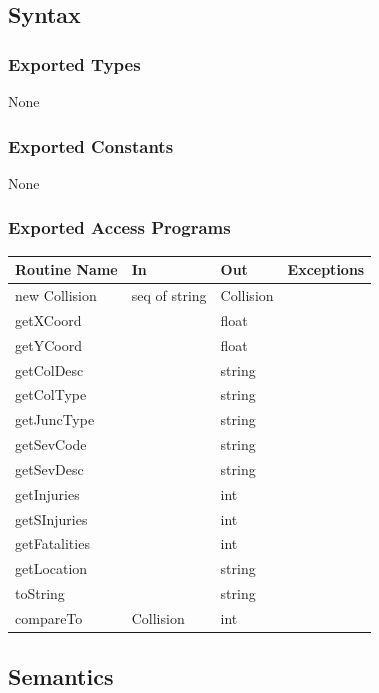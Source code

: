 \documentclass[12pt]{article}
\begin{document}
\subsection*{Syntax}
\subsubsection*{Exported Types}
None

\subsubsection*{Exported Constants}
None

\subsubsection*{Exported Access Programs}
    \begin{tabular}{|l|l|l|l|}
    \hline
    \textbf{Routine Name} & \textbf{In} & \textbf{Out} & \textbf{Exceptions}\\
    \hline
    new Collision & seq of string & Collision & ~\\
    \hline
    getXCoord & ~ & float & ~\\
    \hline
    getYCoord & ~ & float & ~\\
    \hline
    getColDesc & ~ & string & ~\\
    \hline
    getColType & ~ & string & ~\\
    \hline
    getJuncType & ~ & string & ~\\
    \hline
    getSevCode & ~ & string & ~\\
    \hline
    getSevDesc & ~ & string & ~\\
    \hline
    getInjuries & ~ & int & ~\\
    \hline
    getSInjuries & ~ & int & ~\\
    \hline
    getFatalities & ~ & int & ~\\
    \hline
    getLocation & ~ & string & ~\\
    \hline
    toString & ~ & string & ~\\
    \hline
    compareTo & Collision & int & ~\\
    \hline
    \end{tabular}
    
\subsection*{Semantics}
\end{document}
